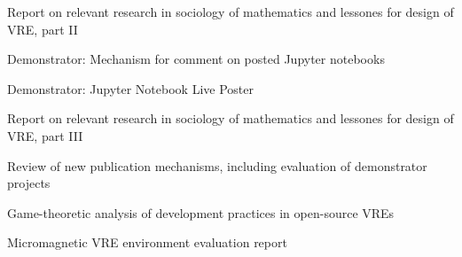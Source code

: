 \begin{workpackage}[id=social-aspects,wphases=0-48,
  title=Social Aspects,
  lead=UO,
  UORM=23,USHRM=18,USORM=6]
\begin{wpdelivs}
\begin{wpdeliv}[due=24,id=social-report-two,dissem=PU,nature=R,lead=UO]
 {Report on relevant research in sociology of mathematics and lessones
   for design of \TheProject VRE, part II}
\end{wpdeliv}
\begin{wpdeliv}[due=24,id=jupyter-comment,dissem=PU,nature=DEM,lead=USH]
   {Demonstrator: Mechanism for comment on posted Jupyter notebooks} 
\end{wpdeliv}

 \begin{wpdeliv}[due=36,id=social-poster,dissem=PU,nature=DEM,lead=USH]
   {Demonstrator: Jupyter Notebook Live Poster} 
\end{wpdeliv}

\begin{wpdeliv}[due=42,id=social-report-three,dissem=PU,nature=R,lead=UO]
 {Report on relevant research in sociology of mathematics and lessones
   for design of \TheProject VRE, part III}
\end{wpdeliv}
\begin{wpdeliv}[due=42,id=social-publishing-report,dissem=PU,nature=R,lead=USH]
{Review of new publication mechanisms, including evaluation of
  demonstrator projects}
\end{wpdeliv}

\begin{wpdeliv}[due=42,id=social-gametheoretic,dissem=PU,nature=R,lead=UO]
{Game-theoretic analysis of development practices in open-source VREs}
\end{wpdeliv}

 \begin{wpdeliv}[due=48,id=oommf-nb-evaluation,dissem=PU,nature=R,lead=USO]
      {Micromagnetic VRE environment evaluation report}
\end{wpdeliv}
\end{wpdelivs}
\end{workpackage}

